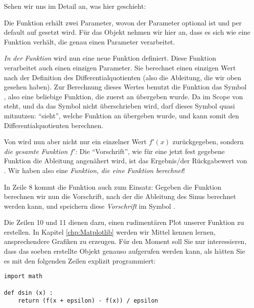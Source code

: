 Sehen wir uns im Detail an, was hier geschieht:

Die Funktion  erhält zwei Parameter, wovon der Parameter  optional ist und per default auf  gesetzt wird. Für das Objekt  nehmen wir hier an, dass es sich wie eine Funktion verhält, die genau einen Parameter verarbeitet.

\emph{In der Funktion}  wird nun eine neue Funktion  definiert. Diese Funktion verarbeitet auch einen einzigen Parameter. Sie berechnet einen einzigen Wert nach der Definition des Differentialquotienten (also die Ableitung, die wir oben gesehen haben). Zur Berechnung dieses Wertes benutzt die Funktion  das Symbol , also eine beliebige Funktion, die zuerst an  übergeben wurde. Da  im Scope von  steht, und da das Symbol  nicht überschrieben wird, darf  dieses Symbol quasi mitnutzen:  \enquote{sieht}, welche Funktion an  übergeben wurde, und kann somit den Differentialquotienten berechnen.

Von  wird nun aber nicht nur ein einzelner Wert $f'(x)$ zurückgegeben, sondern \emph{die gesamte Funktion} $f'$: Die \enquote{Vorschrift}, wie für eine jetzt fest gegebene Funktion  die Ableitung angenähert wird, ist das Ergebnis/der Rückgabewert von . Wir haben also eine \emph{Funktion, die eine Funktion berechnet}!

In Zeile 8 kommt die Funktion  auch zum Einsatz: Gegeben die Funktion  berechnen wir nun die Vorschrift, nach der die Ableitung des Sinus berechnet werden kann, und speichern diese \emph{Vorschrift} im Symbol .

Die Zeilen 10 und 11 dienen dazu, einen rudimentären Plot unserer Funktion zu erstellen. In Kapitel \ref{chp:Matplotlib} werden wir Mittel kennen lernen, ansprechendere Grafiken zu erzeugen. Für den Moment soll Sie nur interessieren, dass das soeben erstellte Objekt  genauso aufgerufen werden kann, als hätten Sie es mit den folgenden Zeilen explizit programmiert:

\begin{codebox}
\begin{verbatim}
import math

def dsin (x) :
    return (f(x + epsilon) - f(x)) / epsilon
\end{verbatim}
\end{codebox}

